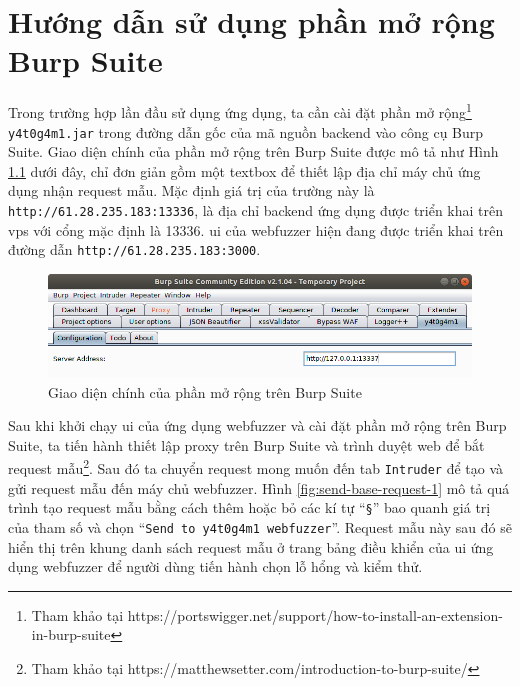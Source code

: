 \cleardoublepage
\appendix
\chapter{Hướng dẫn sử dụng phần mở rộng Burp Suite}
Trong trường hợp lần đầu sử dụng ứng dụng, ta cần cài đặt phần mở rộng\footnote{Tham khảo tại https://portswigger.net/support/how-to-install-an-extension-in-burp-suite} \texttt{y4t0g4m1.jar} trong đường dẫn gốc của mã nguồn backend vào công cụ Burp Suite. Giao diện chính của phần mở rộng trên Burp Suite được mô tả như Hình \ref{fig:main-burp-extension-interface} dưới đây, chỉ đơn giản gồm một textbox để thiết lập địa chỉ máy chủ ứng dụng nhận request mẫu. Mặc định giá trị của trường này là \texttt{http://61.28.235.183:13336}, là địa chỉ backend ứng dụng được triển khai trên \acrshort{vps} với cổng mặc định là 13336. \acrshort{ui} của webfuzzer hiện đang được triển khai trên đường dẫn \texttt{http://61.28.235.183:3000}.
\begin{figure}[H]
  \centering
    \includegraphics[width=\textwidth,keepaspectratio=true]{images/main-burp-extension-interface.png}
  \caption{Giao diện chính của phần mở rộng trên Burp Suite}
  \label{fig:main-burp-extension-interface}
\end{figure}
Sau khi khởi chạy \acrshort{ui} của ứng dụng webfuzzer và cài đặt phần mở rộng trên Burp Suite, ta tiến hành thiết lập proxy trên Burp Suite và trình duyệt web để bắt request mẫu\footnote{Tham khảo tại https://matthewsetter.com/introduction-to-burp-suite/}. Sau đó ta chuyển request mong muốn đến tab \texttt{Intruder} để tạo và gửi request mẫu đến máy chủ webfuzzer. Hình \ref{fig:send-base-request-1} mô tả quá trình tạo request mẫu bằng cách thêm hoặc bỏ các kí tự ``\texttt{\S}'' bao quanh giá trị của tham số và chọn ``\texttt{Send to y4t0g4m1 webfuzzer}''. Request mẫu này sau đó sẽ hiển thị trên khung danh sách request mẫu ở trang bảng điều khiển của \acrshort{ui} ứng dụng webfuzzer để người dùng tiến hành chọn lỗ hổng và kiểm thử.
